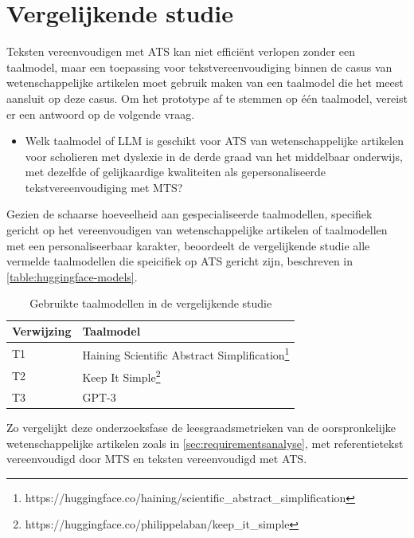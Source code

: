 \section{Vergelijkende studie}
\label{sec:vergelijkende-studie}

Teksten vereenvoudigen met ATS kan niet efficiënt verlopen zonder een taalmodel, maar een toepassing voor tekstvereenvoudiging binnen de casus van wetenschappelijke artikelen moet gebruik maken van een taalmodel die het meest aansluit op deze casus. Om het prototype af te stemmen op één taalmodel, vereist er een antwoord op de volgende vraag. 

\begin{itemize}
	\item Welk taalmodel of LLM is geschikt voor ATS van wetenschappelijke artikelen voor scholieren met dyslexie in de derde graad van het middelbaar onderwijs, met dezelfde of gelijkaardige kwaliteiten als gepersonaliseerde tekstvereenvoudiging met MTS?
\end{itemize}


Gezien de schaarse hoeveelheid aan gespecialiseerde taalmodellen, specifiek gericht op het vereenvoudigen van wetenschappelijke artikelen of taalmodellen met een personaliseerbaar karakter, beoordeelt de vergelijkende studie alle vermelde taalmodellen die speicifiek op ATS gericht zijn, beschreven in \ref{table:huggingface-models}. 

\begin{center}
	\begin{table}[H]
		\begin{tabular}{ | m{4cm} | m{12cm} | } 
			\hline
			\textbf{Verwijzing} & \textbf{Taalmodel} \\
			\hline
			T1 & Haining Scientific Abstract Simplification\footnote{https://huggingface.co/haining/scientific\_abstract\_simplification} \\
			\hline
			T2 & Keep It Simple\footnote{https://huggingface.co/philippelaban/keep\_it\_simple} \\
			\hline
			T3 & GPT-3 \\
			\hline
		\end{tabular}
		\caption{Gebruikte taalmodellen in de vergelijkende studie}
		\label{table:vergelijkende-studie-taalmodellen}
	\end{table}
\end{center}

\medspace

Zo vergelijkt deze onderzoeksfase de leesgraadsmetrieken van de oorspronkelijke wetenschappelijke artikelen zoals in \ref{sec:requirementsanalyse}, met referentietekst vereenvoudigd door MTS en teksten vereenvoudigd met ATS. 


